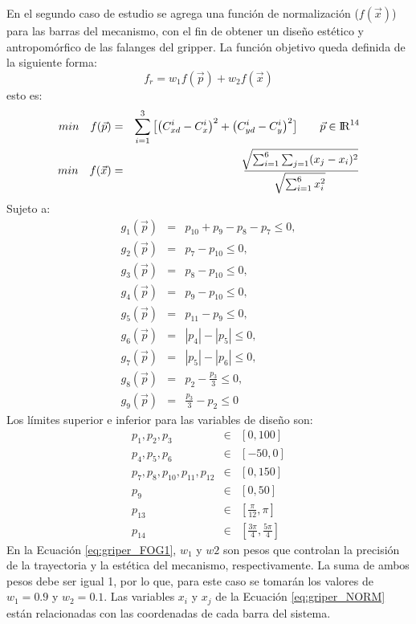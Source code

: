 En el segundo caso de estudio se agrega una función de normalización ($f(\vec{x})$) para las barras del mecanismo, con el fin de obtener un diseño  estético y antropomórfico de las falanges del gripper. La función objetivo queda definida de la siguiente forma:
\begin{equation}\label{eq:griper_FOG1}
  f_r= w_1f(\vec{p})+w_2f(\vec{x})
\end{equation}
esto es:
 \begin{eqnarray}\label{}
min\quad  f(\vec{p})&=&
\sum_{i=1}^{3}\big[\big(C^{i}_{xd}-C^{i}_{x} \big)^2 +\big(C^{i}_{yd}-C^{i}_{y} \big)^2\big] \qquad \vec{p} \in  {\rm I\!R}^{14} \\
min\quad  f(\vec{x})&=&\frac{\sqrt[]{\sum^6_{i=1}\sum_{j=1}(x_j-x_i)^2}}{\sqrt[]{\sum^6_{i=1}x^2_i}} \label{eq:griper_NORM}
\end{eqnarray}
Sujeto a:
\begin{eqnarray}\label{eq:Restricciones griper2}
g_{1}(\vec{p})&=&p_{10}+ p_{9}-p_{8}-p_{7} \leq 0,\\
g_{2}(\vec{p})&=&p_{7}-p_{10} \leq 0,\\
g_{3}(\vec{p})&=&p_{8}-p_{10} \leq 0,\\
g_{4}(\vec{p})&=&p_{9}-p_{10} \leq 0,\\
g_{5}(\vec{p})&=&p_{11}-p_{9} \leq 0,\\
g_{6}(\vec{p})&=&|p_{4}|-|p_{5}| \leq 0,\\
g_{7}(\vec{p})&=&|p_{5}|-|p_{6}| \leq 0,\\
g_{8}(\vec{p})&=&p_{2}-\frac{p_3}{3} \leq 0,\\
g_{9}(\vec{p})&=&\frac{p_3}{3}-p_{2} \leq 0
\end{eqnarray}
Los límites superior e inferior para las variables de diseño son:
\begin{eqnarray}\label{eq:limites variables griper2}
p_1,p_2,p_3 & \in & \left[ 0,100\right] \\
p_4,p_5,p_6 & \in & \left[ -50,0\right] \\
p_7,p_8,p_{10},p_{11},p_{12} & \in & \left[ 0,150 \right] \\
p_9 & \in & \left[ 0,50\right] \\
p_{13} & \in & \left[ \frac{\pi}{12},\pi \right] \\
p_{14} & \in & \left[ \frac{3\pi}{4},\frac{5\pi}{4} \right]
\end{eqnarray}
En la Ecuación \ref{eq:griper_FOG1}, $w_1$ y $w2$ son pesos que controlan la precisión de la trayectoria y la estética del mecanismo, respectivamente. La suma de ambos pesos debe ser igual 1, por lo que, para este caso se tomarán los valores de $w_1=0.9$ y $w_2=0.1$. Las variables $x_i$ y $x_j$ de la Ecuación \ref{eq:griper_NORM} están relacionadas con las coordenadas de cada barra del sistema.


